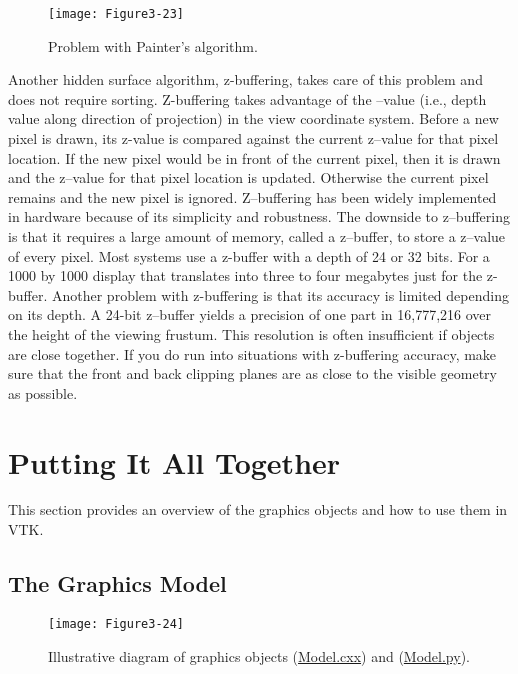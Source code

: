 \begin{figure}[!htb]
  \centering
  \texttt{[image: Figure3-23]}\\
  \caption{Problem with Painter's algorithm.}\label{fig:Figure3-23}
\end{figure}

Another hidden surface algorithm, z-buffering, takes care of this problem and does not require sorting. Z-buffering takes advantage of the --value (i.e., depth value along direction of projection) in the view coordinate system. Before a new pixel is drawn, its z-value is compared against the current z--value for that pixel location. If the new pixel would be in front of the current pixel, then it is drawn and the z--value for that pixel location is updated. Otherwise the current pixel remains and the new pixel is ignored. Z--buffering has been widely implemented in hardware because of its simplicity and robustness. The downside to z--buffering is that it requires a large amount of memory, called a z--buffer, to store a z--value of every pixel. Most systems use a z-buffer with a depth of 24 or 32 bits. For a 1000 by 1000 display that translates into three to four megabytes just for the z-buffer. Another problem with z-buffering is that its accuracy is limited depending on its depth. A 24-bit z--buffer yields a precision of one part in 16,777,216 over the height of the viewing frustum. This resolution is often insufficient if objects are close together. If you do run into situations with z-buffering accuracy, make sure that the front and back clipping planes are as close to the visible geometry as possible.

\section{Putting It All Together}
This section provides an overview of the graphics objects and how to
use them in VTK.

\subsection{The Graphics Model}

\begin{figure}[!htb]
  \centering
  \texttt{[image: Figure3-24]}\\
  \caption{Illustrative diagram of graphics objects (\href{https://lorensen.github.io/VTKExamples/site/Cxx/Rendering/Model/}{Model.cxx}) and (\href{https://lorensen.github.io/VTKExamples/site/Python/Rendering/Model/}{Model.py}).}\label{fig:Figure3-24}
\end{figure}

